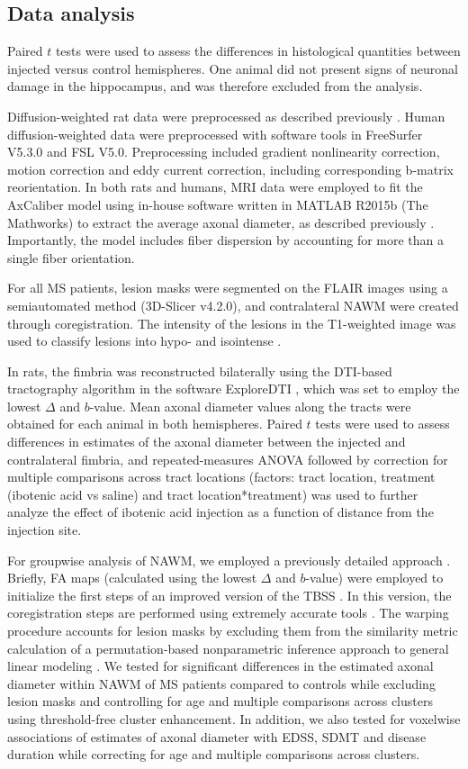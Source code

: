 \documentclass[11pt]{article}
\begin{document}
\subsection{Data analysis}
Paired $t$ tests were used to assess the differences in histological quantities between injected versus control hemispheres. One animal did not present signs of neuronal damage in the hippocampus, and was therefore excluded from the analysis.

Diffusion-weighted rat data were preprocessed as described previously \cite{DeSantis2019a}. Human diffusion-weighted data were preprocessed with software tools in FreeSurfer V5.3.0 and FSL V5.0. Preprocessing included gradient nonlinearity correction, motion correction and eddy current correction, including corresponding b-matrix reorientation. In both rats and humans, MRI data were employed to fit the AxCaliber model using in-house software written in MATLAB R2015b (The Mathworks) to extract the average axonal diameter, as described previously \cite{DeSantis2019b}. Importantly, the model includes fiber dispersion by accounting for more than a single fiber orientation.

For all MS patients, lesion masks were segmented on the FLAIR images using a semiautomated method (3D-Slicer v4.2.0), and contralateral NAWM were created through coregistration. The intensity of the lesions in the T1-weighted image was used to classify lesions into hypo- and isointense \cite{vandenElskamp2008}.

In rats, the fimbria was reconstructed bilaterally using the DTI-based tractography algorithm in the software ExploreDTI \cite{LeemansExploreDTI}, which was set to employ the lowest $\Delta$ and $b$-value. Mean axonal diameter values along the tracts were obtained for each animal in both hemispheres. Paired $t$ tests were used to assess differences in estimates of the axonal diameter between the injected and contralateral fimbria, and repeated-measures ANOVA followed by correction for multiple comparisons across tract locations (factors: tract location, treatment (ibotenic acid vs saline) and tract location*treatment) was used to further analyze the effect of ibotenic acid injection as a function of distance from the injection site.

For groupwise analysis of NAWM, we employed a previously detailed approach \cite{DeSantis2019a}. Briefly, FA maps (calculated using the lowest $\Delta$ and $b$-value) were employed to initialize the first steps of an improved version of the TBSS \cite{Smith2006}. In this version, the coregistration steps are performed using extremely accurate tools \cite{Klein2009}. The warping procedure accounts for lesion masks by excluding them from the similarity metric calculation of a permutation-based nonparametric inference approach to general linear modeling \cite{Winkler2014}. We tested for significant differences in the estimated axonal diameter within NAWM of MS patients compared to controls while excluding lesion masks and controlling for age and multiple comparisons across clusters using threshold-free cluster enhancement. In addition, we also tested for voxelwise associations of estimates of axonal diameter with EDSS, SDMT and disease duration while correcting for age and multiple comparisons across clusters.
\end{document}
